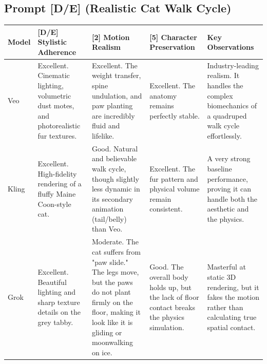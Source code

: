 \documentclass[sigconf]{acmart}
\begin{document}
\subsection*{Prompt [D/E] (Realistic Cat Walk Cycle)}
\begin{table}[t]
    \centering
    \renewcommand{\arraystretch}{1.3}
    \begin{tabularx}{\textwidth}{| l | >{\raggedright\arraybackslash}X | >{\raggedright\arraybackslash}X | >{\raggedright\arraybackslash}X | >{\raggedright\arraybackslash}X |}
        \hline
        \textbf{Model} & \textbf{[D/E] Stylistic Adherence}                                                                & \textbf{[2] Motion Realism}                                                                                                                                        & \textbf{[5] Character Preservation}                                                           & \textbf{Key Observations}                                                                                                                          \\\hline
        Veo            & Excellent. Cinematic lighting, volumetric dust motes, and photorealistic fur textures.            & Excellent. The weight transfer, spine undulation, and paw planting are incredibly fluid and lifelike.                                                              & Excellent. The anatomy remains perfectly stable.                                              & Industry-leading realism. It handles the complex biomechanics of a quadruped walk cycle effortlessly.                                              \\\hline
        Kling          & Excellent. High-fidelity rendering of a fluffy Maine Coon-style cat.                              & Good. Natural and believable walk cycle, though slightly less dynamic in its secondary animation (tail/belly) than Veo.                                            & Excellent. The fur pattern and physical volume remain consistent.                             & A very strong baseline performance, proving it can handle both the aesthetic and the physics.                                                      \\\hline
        Grok           & Excellent. Beautiful lighting and sharp texture details on the grey tabby.                        & Moderate. The cat suffers from "paw slide." The legs move, but the paws do not plant firmly on the floor, making it look like it is gliding or moonwalking on ice. & Good. The overall body holds up, but the lack of floor contact breaks the physics simulation. & Masterful at static 3D rendering, but it fakes the motion rather than calculating true spatial contact.                                            \\\hline

\end{tabularx}
\end{table}
\end{document}
